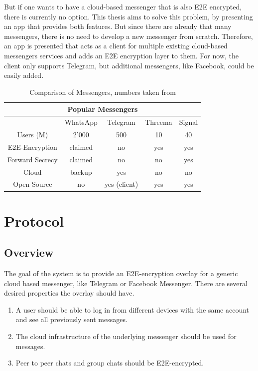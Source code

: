 \documentclass[a4paper, oneside]{discothesis}
\begin{document}
But if one wants to have a cloud-based messenger that is also E2E encrypted, there is currently no option. This thesis aims to solve this problem, by presenting an app that provides both features. But since there are already that many messengers, there is no need to develop a new messenger from scratch. Therefore, an app is presented that acts as a client for multiple existing cloud-based messengers services and adds an E2E encryption layer to them. For now, the client only supports Telegram, but additional messengers, like Facebook, could be easily added.


\begin{table}[h!]
\centering
\begin{center}
 \begin{tabular}{|| c ||c c c c||} 
  \hline
 \multicolumn{5}{|c|}{Popular Messengers} \\
 \hline
 \hline
   & WhatsApp & Telegram & Threema & Signal \\ [0.5ex] 
 \hline\hline
 Users (M) & 2'000 & 500 & 10 & 40 \\ 
 \hline
 E2E-Encryption & claimed\footnotemark & no & yes & yes \\
 \hline
 Forward Secrecy & claimed\footnotemark[\value{footnote}] & no & no & yes \\
 \hline
 Cloud & backup & yes & no & no \\
 \hline
 Open Source & no & yes (client) & yes & yes \\
 \hline
\end{tabular}
\end{center}
\caption{Comparison of Messengers, numbers taken from \cite{Business, Statistia}}
\label{table:messengers}
\end{table}


\chapter{Protocol}

\section{Overview}
The goal of the system is to provide an E2E-encryption overlay for a generic cloud based messenger, like Telegram or Facebook Messenger. There are several desired properties the overlay should have.

\begin{enumerate}
  \item A user should be able to log in from different devices with the same account and see all previously sent messages. 
  \item The cloud infrastructure of the underlying messenger should be used for messages.
  \item Peer to peer chats and group chats should be E2E-encrypted.
\end{enumerate}
\end{document}
